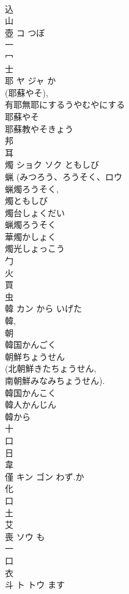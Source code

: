 \documentclass[8pt]{extreport}
\begin{document}
\begin{CJK}{UTF8}{min}
\\	込 
\\	山 
\\	壺	コ	つぼ	
\\	一 
\\	冖 
\\	士 
\\	耶	ヤ ジャ	か	
\\	(耶蘇やそ), 
\\	有耶無耶にするうやむやにする 
\\	耶蘇やそ 
\\	耶蘇教やそきょう 
\\	邦 
\\	耳 
\\	燭	ショク ソク	ともしび	
\\	蝋 (みつろう、ろうそく、ロウ 
\\	蝋燭ろうそく, 
\\	燭ともしび 
\\	燭台しょくだい 
\\	蝋燭ろうそく 
\\	華燭かしょく 
\\	燭光しょっこう 
\\	勹 
\\	火 
\\	買 
\\	虫 
\\	韓	カン	から いげた	
\\	韓, 
\\	朝 
\\	韓国かんごく 
\\	朝鮮ちょうせん 
\\	(北朝鮮きたちょうせん, 
\\	南朝鮮みなみちょうせん).
\\	韓国かんこく 
\\	韓人かんじん 
\\	韓から 
\\	十 
\\	口 
\\	日 
\\	韋 
\\	僅	キン ゴン	わず.か	
\\	化 
\\	口 
\\	土 
\\	艾 
\\	喪	ソウ	も	
\\	一 
\\	口 
\\	衣 
\\	斗	ト トウ	ます	

\end{CJK}
\end{document}

